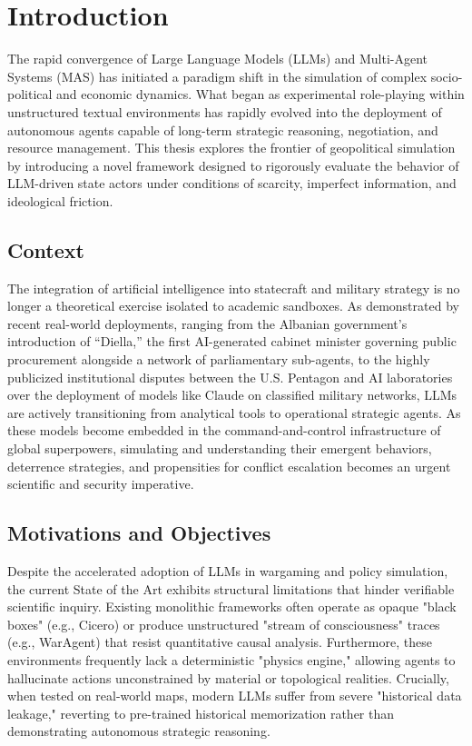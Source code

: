 \chapter{Introduction}
\label{chap:introduction}

The rapid convergence of Large Language Models (LLMs) and Multi-Agent Systems (MAS) has initiated a paradigm shift in the simulation of complex socio-political and economic dynamics. What began as experimental role-playing within unstructured textual environments has rapidly evolved into the deployment of autonomous agents capable of long-term strategic reasoning, negotiation, and resource management. This thesis explores the frontier of geopolitical simulation by introducing a novel framework designed to rigorously evaluate the behavior of LLM-driven state actors under conditions of scarcity, imperfect information, and ideological friction.

\section{Context}
\label{sec:intro_context}
The integration of artificial intelligence into statecraft and military strategy is no longer a theoretical exercise isolated to academic sandboxes. As demonstrated by recent real-world deployments, ranging from the Albanian government's introduction of ``Diella,'' the first AI-generated cabinet minister governing public procurement alongside a network of parliamentary sub-agents, to the highly publicized institutional disputes between the U.S. Pentagon and AI laboratories over the deployment of models like Claude on classified military networks, LLMs are actively transitioning from analytical tools to operational strategic agents.
As these models become embedded in the command-and-control infrastructure of global superpowers, simulating and understanding their emergent behaviors, deterrence strategies, and propensities for conflict escalation becomes an urgent scientific and security imperative. 

\section{Motivations and Objectives}
\label{sec:intro_motivations}
Despite the accelerated adoption of LLMs in wargaming and policy simulation, the current State of the Art exhibits structural limitations that hinder verifiable scientific inquiry. Existing monolithic frameworks often operate as opaque "black boxes" (e.g., Cicero) or produce unstructured "stream of consciousness" traces (e.g., WarAgent) that resist quantitative causal analysis. Furthermore, these environments frequently lack a deterministic "physics engine," allowing agents to hallucinate actions unconstrained by material or topological realities. Crucially, when tested on real-world maps, modern LLMs suffer from severe "historical data leakage," reverting to pre-trained historical memorization rather than demonstrating autonomous strategic reasoning.

